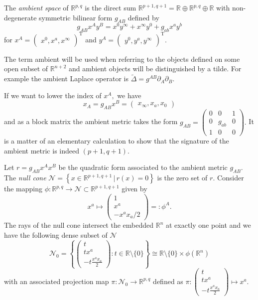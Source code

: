 \documentclass[final]{birkmult}
\theoremstyle{definition}
\theoremstyle{remark}
\numberwithin{equation}{section}
\newcommand{\p}[1]{\partial_{#1}}
\newcommand{\alap}{\widetilde{\Delta}}
\newcommand{\R}{\mathbb{R}^{p,q}}
\newcommand{\aR}{\mathbb{R}^{p+1,q+1}}
\begin{document}
  The \emph{ambient space} of $\R$ is the direct sum $\aR = \mathbb{R}\oplus\R \oplus \mathbb{R}$ with non-degenerate symmetric bilinear form $g_{AB}$ defined by
  \begin{equation*}
	 g_{AB}x^Ay^B = x^0y^\infty + x^\infty y^0 + g_{ab} x^a y^b
  \end{equation*}
  for 
  \(
  x^A = \begin{pmatrix}
	x^0, x^a, x^\infty
	\end{pmatrix}^\mathrm{T}\) and \(y^A = \begin{pmatrix}
	y^0,y^a,y^\infty
	\end{pmatrix}^\mathrm{T}\).


  The term ambient will be used when referring to the objects defined on some open subset of $\mathbb{R}^{n+2}$ and  ambient objects will be distinguished by a tilde. For example the ambient Laplace operator is $\alap = g^{AB}\p{A}\p{B}$.

  If we want to lower the index of $x^A,$ we have 
  \[
  x_A = g_{AB}x^B =  \begin{pmatrix}
  x_\infty,
  x_a,
  x_0
  \end{pmatrix} 
  \]
  and as a block matrix the ambient metric takes the form
  \(  g_{AB} = \left(\begin{smallmatrix}
		    0 & 0 & 1 \\ 
		    0 & g_{ab} & 0 \\ 
		    1 & 0 & 0
	      \end{smallmatrix} \right).  \)
  It is a matter of an elementary calculation to show that the signature of the ambient metric is indeed $(p+1,q+1)$.

  Let  $ r = g_{AB}x^Ax^B$ be the quadratic form associated to the ambient metric $g_{AB}$. The \emph{null cone} $\mathcal{N} = \left\{ x \in \aR\, |\, r(x) = 0 \right\}$ is the zero set of $r$. Consider the mapping $\phi: \R \rightarrow \mathcal{N} \subset \aR$ given by %
  \[
  x^a \mapsto \begin{pmatrix}
								  1 \\
								  x^a \\
								  -x^a x_a / 2
						  \end{pmatrix} =: \phi^A.
  \]
  The rays of the null cone intersect the embedded $\mathbb{R}^n$ at exactly one point and we have the following dense subset of $\mathcal{N}$
  \[\mathcal{N}_0= \left\{ \begin{pmatrix} t\\tx^a\\-t\frac{x^ax_a}{2}\end{pmatrix} : t \in \mathbb{R} \setminus\{ 0\}  \right\} \cong \mathbb{R}\setminus\{0\} \times \phi(\mathbb{R}^n) \]
  with an associated projection map $\pi: \mathcal{N}_0 \to \R$ defined as 
  \(\pi: \begin{pmatrix} t\\tx^a\\-t\frac{x^ax_a}{2}\end{pmatrix} \mapsto  x^a.\)
\end{document}
